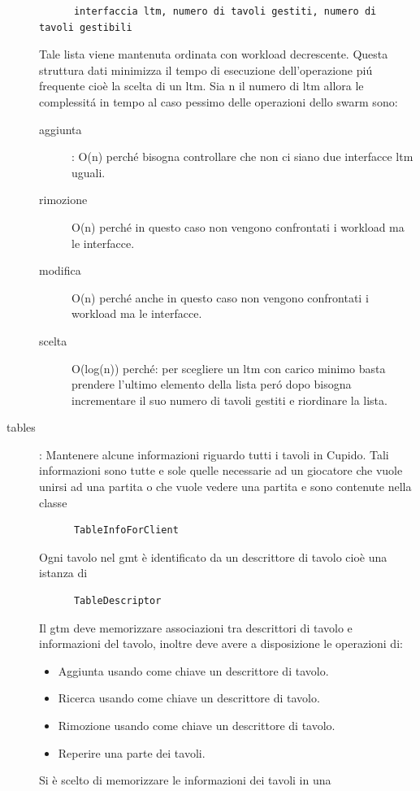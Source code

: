 \begin{description}
\begin{verbatim}
	  interfaccia ltm, numero di tavoli gestiti, numero di tavoli gestibili
	\end{verbatim}
	Tale lista viene mantenuta ordinata con workload decrescente. Questa struttura dati minimizza il tempo di esecuzione dell'operazione pi\'u frequente cio\`e la scelta di un ltm.  Sia n il numero di ltm allora le complessit\'a in tempo al caso pessimo delle operazioni dello swarm sono:
	\begin{description}
	  \item[aggiunta]: 
	    O(n) perch\'e bisogna controllare che non ci siano due interfacce ltm uguali.
	  \item[rimozione]
	    O(n) perch\'e in questo caso non vengono confrontati i workload ma le interfacce.
	  \item[modifica]
	    O(n) perch\'e anche in questo caso non vengono confrontati i workload ma le interfacce.
	  \item[scelta]
	    O(log(n)) perch\'e: per scegliere un ltm con carico minimo basta prendere l'ultimo elemento della lista per\'o dopo bisogna incrementare il suo numero di tavoli gestiti e riordinare la lista.
	\end{description}
      \item[tables]:
	Mantenere alcune informazioni riguardo tutti i tavoli in Cupido. Tali informazioni sono tutte e sole quelle necessarie ad un giocatore che vuole unirsi ad una partita o che vuole vedere una partita e sono contenute nella classe 
	\begin{verbatim}
	  TableInfoForClient
	\end{verbatim}
	Ogni tavolo nel gmt \`e identificato da un descrittore di tavolo cio\`e una istanza di
	\begin{verbatim}
	  TableDescriptor
	\end{verbatim}
	Il gtm deve memorizzare associazioni tra descrittori di tavolo e informazioni del tavolo, inoltre deve avere a disposizione le operazioni di:
	\begin{itemize}
	  \item 
	    Aggiunta usando come chiave un descrittore di tavolo.
	  \item
	    Ricerca usando come chiave un descrittore di tavolo.
	  \item
	    Rimozione usando come chiave un descrittore di tavolo.
	  \item
	    Reperire una parte dei tavoli.
	\end{itemize}
	Si \`e scelto di memorizzare le informazioni dei tavoli in una 

\end{description}
